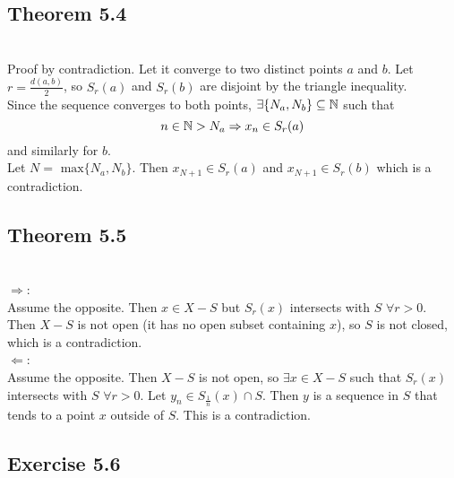 \subsection{Theorem 5.4}


\begin{solution}
 \\Proof by contradiction. Let it converge to two distinct points $a$ and $b$. Let $r = \frac{d(a,b)}{2}$, so $S_r(a)$ and $S_r(b)$ are disjoint by the triangle inequality.\\
 Since the sequence converges to both points, $\exists \{N_a,N_b\} \subseteq \mathbb{N}$ such that
 $$n \in \mathbb{N} > N_a \Rightarrow x_n \in S_r(a)$$
 and similarly for $b$. \\
 Let $N = \text{ max} \{N_a,N_b\}$. Then $x_{N+1} \in S_r(a)$ and $x_{N+1} \in S_r(b)$ which is a contradiction.
\end{solution}

\subsection{Theorem 5.5} \label{thm3.5.5}


\begin{solution}
 \\$\Rightarrow$: \\
 Assume the opposite. Then $x \in X-S$ but $S_r(x)$ intersects with $S$ $\forall r > 0$. Then $X-S$ is not open (it has no open subset containing $x$), so $S$ is not closed, which is a contradiction. \\
 $\Leftarrow$: \\
 Assume the opposite. Then $X-S$ is not open, so $\exists x \in X-S$ such that $S_r(x)$ intersects with $S$ $\forall r > 0$. Let $y_n \in S_{\frac{1}{n}}(x) \cap S$. Then $y$ is a sequence in $S$ that tends to a point $x$ outside of $S$. This is a contradiction.
\end{solution}

\subsection{Exercise 5.6}


